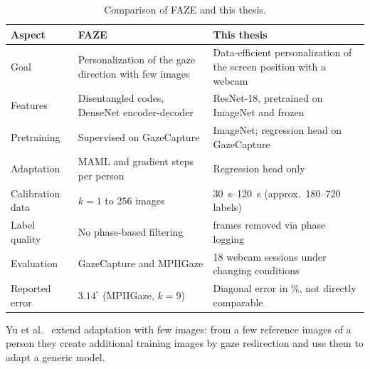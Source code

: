 \begin{table}[htbp]
  \centering
  \small
  \caption{Comparison of FAZE and this thesis.}
  \label{tab:faze_vergleich}
  \begin{tabularx}{\textwidth}{L{3.0cm} Y Y}
    \toprule
    \textbf{Aspect} & \textbf{FAZE~\cite{park2019faze}} & \textbf{This thesis} \\
    \midrule
    Goal & Personalization of the gaze direction with few images & Data-efficient personalization of the screen position with a webcam \\
    Features & Disentangled codes, DenseNet encoder-decoder & ResNet-18, pretrained on ImageNet and frozen \\
    Pretraining & Supervised on GazeCapture & ImageNet; regression head on GazeCapture \\
    Adaptation & MAML and gradient steps per person & Regression head only \\
    Calibration data & $k = 1$ to $256$ images & \SIrange{30}{120}{\second} (approx.\ 180--720 labels) \\
    Label quality & No phase-based filtering &  frames removed via phase logging \\
    Evaluation & GazeCapture and MPIIGaze & 18 webcam sessions under changing conditions \\
    Reported error & $3.14^\circ$ (MPIIGaze, $k = 9$) & Diagonal error in \%, not directly comparable \\
    \bottomrule
  \end{tabularx}
\end{table}

Yu et al.~\cite{yu2019redirection} extend adaptation with few images: from a
few reference images of a person they create additional training images by gaze
redirection and use them to adapt a generic model.

